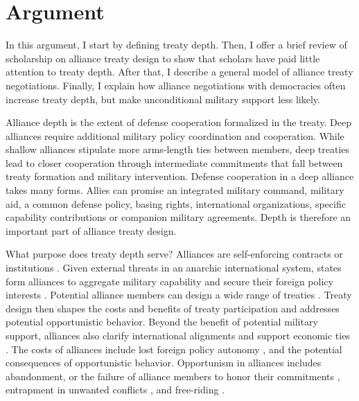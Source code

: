 \documentclass[12pt]{article}
\begin{document}
\section{Argument}


In this argument, I start by defining treaty depth. 
Then, I offer a brief review of scholarship on alliance treaty design to show that scholars have paid little attention to treaty depth.  
After that, I describe a general model of alliance treaty negotiations. 
Finally, I explain how alliance negotiations with democracies often increase treaty depth, but make unconditional military support less likely. 


Alliance depth is the extent of defense cooperation formalized in the treaty. 
Deep alliances require additional military policy coordination and cooperation. 
While shallow alliances stipulate more arms-length ties between members, deep treaties lead to closer cooperation through intermediate commitments that fall between treaty formation and military intervention. 
Defense cooperation in a deep alliance takes many forms. 
Allies can promise an integrated military command, military aid, a common defense policy, basing rights, international organizations, specific capability contributions or companion military agreements. 
Depth is therefore an important part of alliance treaty design.


What purpose does treaty depth serve? 
Alliances are self-enforcing contracts or institutions \citep{Leedsetal2002, Morrow2000}.
Given external threats in an anarchic international system, states form alliances to aggregate military capability and secure their foreign policy interests \citep{Altfield1984, Smith1995, Snyder1997, FordhamPoast2014}. 
Potential alliance members can design a wide range of treaties \citep{Leedsetal2000, Leedsetal2002, Benson2012, BensonClinton2016}. 
Treaty design then shapes the costs and benefits of treaty participation and addresses potential opportunistic behavior. 
Beyond the benefit of potential military support, alliances also clarify international alignments \citep{Snyder1990} and support economic ties \citep{Gowa1995, Li2003, Long2003, Fordham2010, WolfordKim2017}. 
The costs of alliances include lost foreign policy autonomy \citep{Altfield1984, Morrow2000, Johnson2015}, and the potential consequences of opportunistic behavior. 
Opportunism in alliances includes abandonment, or the failure of alliance members to honor their commitments \citep{Leeds2003a, BerkemeierFuhrmann2018}, entrapment in unwanted conflicts \citep{Snyder1984}, and free-riding \citep{Morrow2000}.   
\end{document}
